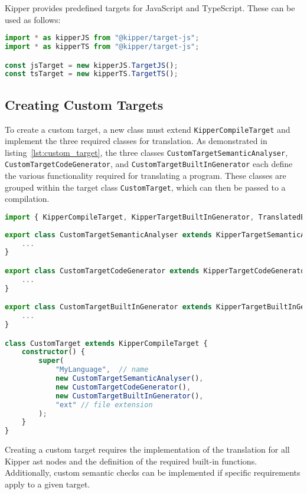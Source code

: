 Kipper provides predefined targets for JavaScript and TypeScript. These can be used as follows:

\begin{lstlisting}[language=Typescript, caption=Using Compilation Targets, label=lst:using_targets]
import * as kipperJS from "@kipper/target-js";
import * as kipperTS from "@kipper/target-js";

const jsTarget = new kipperJS.TargetJS();
const tsTarget = new kipperTS.TargetTS();
\end{lstlisting}

\subsection{Creating Custom Targets}
\label{subsec:custom_targets}

To create a custom target, a new class must extend \lstinline|KipperCompileTarget| and implement the three required classes for translation. As demonstrated in listing~\ref{lst:custom_target}, the three classes \lstinline|CustomTargetSemanticAnalyser|, \lstinline|CustomTargetCodeGenerator|, and \lstinline|CustomTargetBuiltInGenerator| each define the various functionality required for translating a program. These classes are grouped within the target class \lstinline|CustomTarget|, which can then be passed to a compilation.

\begin{lstlisting}[language=Typescript, caption=Creating a Custom Compilation Target, label=lst:custom_target]
import { KipperCompileTarget, KipperTargetBuiltInGenerator, TranslatedExpression } from "@kipper/core";
	
export class CustomTargetSemanticAnalyser extends KipperTargetSemanticAnalyser {
	...
}

export class CustomTargetCodeGenerator extends KipperTargetCodeGenerator {
	...
}

export class CustomTargetBuiltInGenerator extends KipperTargetBuiltInGenerator {
	...
}

class CustomTarget extends KipperCompileTarget {
	constructor() {
		super(
			"MyLanguage",  // name
			new CustomTargetSemanticAnalyser(), 
			new CustomTargetCodeGenerator(), 
			new CustomTargetBuiltInGenerator(), 
			"ext" // file extension
		);
	}
}
\end{lstlisting}

Creating a custom target requires the implementation of the translation for all Kipper \acrshort{ast} nodes and the definition of the required built-in functions. Additionally, custom semantic checks can be implemented if specific requirements apply to a given target.

